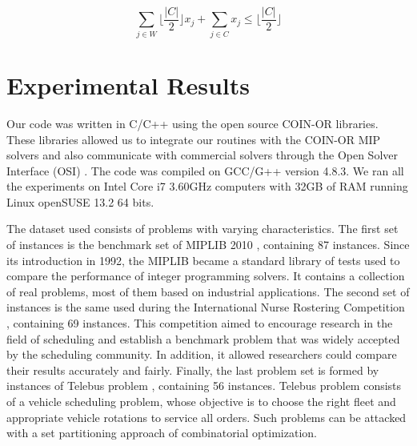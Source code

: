 \documentclass{endm}
\begin{document}
\begin{equation}
	\sum_{j \in W} \lfloor \frac{|C|}{2} \rfloor x_{j} + \sum_{j \in C} x_{j} \leq \lfloor \frac{|C|}{2} \rfloor
\end{equation}

\begin{figure}
\begin{center}
\label{figOH}
\end{center}
\end{figure}


\section{Experimental Results}\label{experiments}

Our code was written in C/C++ using the open source COIN-OR libraries. These libraries allowed us to integrate our routines with the COIN-OR MIP solvers \cite{Forrest2005,Linderoth2005,Ralphs2005} and also communicate with commercial solvers through the Open Solver Interface (OSI) \cite{Saltzman2004}. The code was compiled on GCC/G++ version 4.8.3. We ran all the experiments on Intel Core i7 3.60GHz computers with 32GB of RAM running Linux openSUSE 13.2 64 bits.

The dataset used consists of problems with varying characteristics. The first set of instances is the benchmark set of MIPLIB 2010 \cite{miplib}, containing 87 instances. Since its introduction in 1992, the MIPLIB became a standard library of tests used to compare the performance of integer programming solvers. It contains a collection of real problems, most of them based on industrial applications. The second set of instances is the same used during the International Nurse Rostering Competition \cite{haspeslagh}, containing 69 instances. This competition aimed to encourage research in the field of scheduling and establish a benchmark problem that was widely accepted by the scheduling community. In addition, it allowed researchers could compare their results accurately and fairly. Finally, the last problem set is formed by instances of Telebus problem \cite{Borndorfer1998}, containing 56 instances. Telebus problem consists of a vehicle scheduling problem, whose objective is to choose the right fleet and appropriate vehicle rotations to service all orders. Such problems can be attacked with a set partitioning approach of combinatorial optimization.
\end{document}

